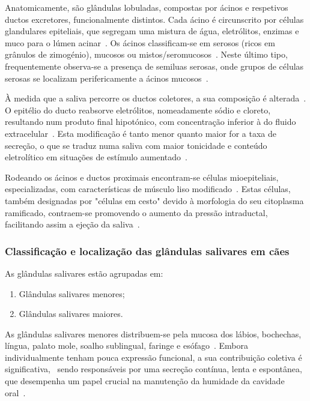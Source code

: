 Anatomicamente, são glândulas lobuladas, compostas por ácinos e respetivos ductos excretores, funcionalmente distintos. Cada ácino é circunscrito por células glandulares epiteliais, que segregam uma mistura de água, eletrólitos, enzimas e muco para o lúmen acinar~\cite{Proctor2007,cunningham}.  Os ácinos classificam-se em serosos (ricos em grânulos de zimogénio), mucosos ou mistos/seromucosos~\cite{cunningham}. Neste último tipo, frequentemente observa-se a presença de semiluas serosas, onde grupos de células serosas se localizam perifericamente a ácinos mucosos~\cite{Das_Textbook,cunningham}. 

À medida que a saliva percorre os ductos coletores, a sua composição é alterada~\cite{Proctor2007,cunningham}.  O epitélio do ducto reabsorve eletrólitos, nomeadamente sódio e cloreto, resultando num produto final hipotónico, com concentração inferior à do fluido extracelular~\cite{cunningham}. Esta modificação é tanto menor quanto maior for a taxa de secreção, o que se traduz numa saliva com maior tonicidade e conteúdo eletrolítico em situações de estímulo aumentado~\cite{cunningham}.  

Rodeando os ácinos e ductos proximais encontram-se células mioepiteliais, especializadas, com características de músculo liso modificado~\cite{cunningham}. Estas células, também designadas por "células em cesto" devido à morfologia do seu citoplasma ramificado, contraem-se promovendo o aumento da pressão intraductal, facilitando assim a ejeção da saliva~\cite{Das_Textbook,cunningham}. 

\subsubsection{Classificação e localização das glândulas salivares em cães}

As glândulas salivares estão agrupadas em:
\begin{enumerate}
    \item	Glândulas salivares menores;
    \item Glândulas salivares maiores.
\end{enumerate}

As glândulas salivares menores distribuem-se pela mucosa dos lábios, bochechas, língua, palato mole, soalho sublingual, faringe e esófago~\cite{Singh2017}.  Embora individualmente tenham pouca expressão funcional, a sua contribuição coletiva é significativa,~\cite{Singh2017} sendo responsáveis por uma secreção contínua, lenta e espontânea, que desempenha um papel crucial na manutenção da humidade da cavidade oral~\cite{Cappai2021}. 

